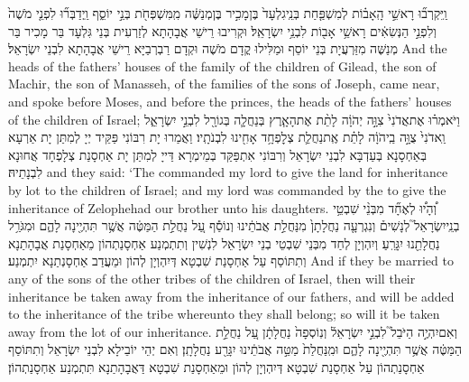 \newperek
{}%
{וַֽיִּקְרְב֞וּ רָאשֵׁ֣י הָֽאָב֗וֹת לְמִשְׁפַּ֤חַת בְּנֵֽי\maqqaf גִלְעָד֙ בֶּן\maqqaf מָכִ֣יר בֶּן\maqqaf מְנַשֶּׁ֔ה מִֽמִּשְׁפְּחֹ֖ת בְּנֵ֣י יוֹסֵ֑ף וַֽיְדַבְּר֞וּ לִפְנֵ֤י מֹשֶׁה֙ וְלִפְנֵ֣י הַנְּשִׂאִ֔ים רָאשֵׁ֥י אָב֖וֹת לִבְנֵ֥י יִשְׂרָאֵֽל׃}
{וּקְרִיבוּ רֵישֵׁי אֲבָהָתָא לְזַרְעִית בְּנֵי גִּלְעָד בַּר מָכִיר בַּר מְנַשֶּׁה מִזַּרְעֲיָת בְּנֵי יוֹסֵף וּמַלִּילוּ קֳדָם מֹשֶׁה וּקְדָם רַבְרְבַיָּא רֵישֵׁי אֲבָהָתָא לִבְנֵי יִשְׂרָאֵל׃}
{And the heads of the fathers’ houses of the family of the children of Gilead, the son of Machir, the son of Manasseh, of the families of the sons of Joseph, came near, and spoke before Moses, and before the princes, the heads of the fathers’ houses of the children of Israel;}{}
{וַיֹּאמְר֗וּ אֶת\maqqaf אֲדֹנִי֙ צִוָּ֣ה יְהֹוָ֔ה לָתֵ֨ת אֶת\maqqaf הָאָ֧רֶץ בְּנַחֲלָ֛ה בְּגוֹרָ֖ל לִבְנֵ֣י יִשְׂרָאֵ֑ל וַֽאדֹנִי֙ צֻוָּ֣ה בַֽיהֹוָ֔ה לָתֵ֗ת אֶֽת\maqqaf נַחֲלַ֛ת צְלׇפְחָ֥ד אָחִ֖ינוּ לִבְנֹתָֽיו׃}
{וַאֲמַרוּ יָת רִבּוֹנִי פַּקֵּיד יְיָ לְמִתַּן יָת אַרְעָא בְּאַחְסָנָא בְּעַדְבָּא לִבְנֵי יִשְׂרָאֵל וְרִבּוֹנִי אִתְפַּקַּד בְּמֵימְרָא דַּייָ לְמִתַּן יָת אַחְסָנַת צְלָפְחָד אֲחוּנָא לִבְנָתֵיהּ׃}
{and they said: ‘The \lord\space commanded my lord to give the land for inheritance by lot to the children of Israel; and my lord was commanded by the \lord\space to give the inheritance of Zelophehad our brother unto his daughters.}{}
{וְ֠הָי֠וּ לְאֶחָ֞ד מִבְּנֵ֨י שִׁבְטֵ֥י בְנֵֽי\maqqaf יִשְׂרָאֵל֮ לְנָשִׁים֒ וְנִגְרְעָ֤ה נַחֲלָתָן֙ מִנַּחֲלַ֣ת אֲבֹתֵ֔ינוּ וְנוֹסַ֕ף עַ֚ל נַחֲלַ֣ת הַמַּטֶּ֔ה אֲשֶׁ֥ר תִּהְיֶ֖ינָה לָהֶ֑ם וּמִגֹּרַ֥ל נַחֲלָתֵ֖נוּ יִגָּרֵֽעַ׃}
{וְיִהְוְיָן לְחַד מִבְּנֵי שִׁבְטֵי בְנֵי יִשְׂרָאֵל לִנְשִׁין וְתִתְמְנַע אַחְסָנַתְהוֹן מֵאַחְסָנַת אֲבָהָתַנָא וְתִתּוֹסַף עַל אַחְסָנַת שִׁבְטָא דְּיִהְוְיָן לְהוֹן וּמֵעֲדַב אַחְסָנְתַנָא יִתְמְנַע׃}
{And if they be married to any of the sons of the other tribes of the children of Israel, then will their inheritance be taken away from the inheritance of our fathers, and will be added to the inheritance of the tribe whereunto they shall belong; so will it be taken away from the lot of our inheritance.}{}
{וְאִם\maqqaf יִהְיֶ֣ה הַיֹּבֵל֮ לִבְנֵ֣י יִשְׂרָאֵל֒ וְנֽוֹסְפָה֙ נַחֲלָתָ֔ן עַ֚ל נַחֲלַ֣ת הַמַּטֶּ֔ה אֲשֶׁ֥ר תִּהְיֶ֖ינָה לָהֶ֑ם וּמִֽנַּחֲלַת֙ מַטֵּ֣ה אֲבֹתֵ֔ינוּ יִגָּרַ֖ע נַחֲלָתָֽן׃}
{וְאִם יְהֵי יוֹבֵילָא לִבְנֵי יִשְׂרָאֵל וְתִתּוֹסַף אַחְסָנַתְהוֹן עַל אַחְסָנַת שִׁבְטָא דְּיִהְוְיָן לְהוֹן וּמֵאַחְסָנַת שִׁבְטָא דַּאֲבָהָתַנָא תִּתְמְנַע אַחְסָנַתְהוֹן׃}
